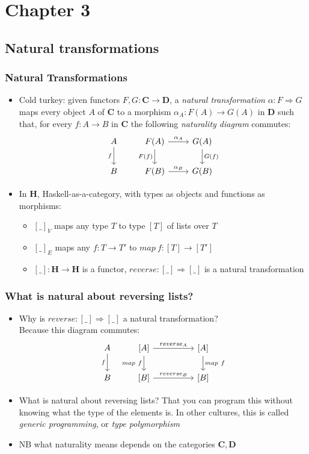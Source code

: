 \documentclass[handout]{beamer}
\title[INF223 presentations]{}
\newcommand{\To}{\Rightarrow}
\newcommand{\bfsf}[1]{{\boldsymbol{#1}}}
\newcommand{\CC}{\bfsf{C}}
\newcommand{\DD}{\bfsf{D}}
\newcommand{\HH}{\bfsf{H}}
\begin{document}
\section{Chapter 3}
\subsection{Natural transformations}
 
\frame
  {   
    \frametitle{Natural Transformations}\label{Ch3:NatTrans}

 \begin{itemize}[<+->]
\item Cold turkey: given functors $F,G: \CC\to\DD$, a \emph{natural transformation}
$\alpha: F\To G$ maps every object $A$ of $\CC$ to a morphism $\alpha_A : F(A)\to G(A)$
in $\DD$ such that, for every $f: A\to B$ in $\CC$ the following
\emph{naturality diagram} commutes:
\[
\begin{tikzcd}[ampersand replacement=\&]
A \arrow[swap]{d}{f} \& F(A)  \arrow[swap]{d}{F(f)}\arrow{r}{\alpha_A} \&\arrow{d}{G(f)} G(A)\\
B \& F(B)  \arrow{r}{\alpha_B} \& G(B)
\end{tikzcd}
\]
\item In $\HH$, Haskell-as-a-category, with types as objects and functions as morphisms:
   \begin{itemize}[<+->]
\item $[\_]_V$ maps any type $T$ to type $[T]$ of lists over $T$
\item $[\_]_E$ maps any $f: T\to T'$ to $map~f: [T] \to [T']$
\item $[\_]:\HH\to\HH$ is a functor, $reverse: [\_] \To [\_]$ is a natural transformation
   \end{itemize}
 \end{itemize}

 }

\frame
  {   
    \frametitle{What is natural about reversing lists?}\label{Ch3:reverse}

 \begin{itemize}[<+->]
\item Why is $reverse: [\_] \To [\_]$ a natural transformation?\\
Because this diagram commutes:
\[
\begin{tikzcd}[ampersand replacement=\&]
A \arrow[swap]{d}{f} \& {[A]}  \arrow[swap]{d}{map~f}\arrow{rr}{reverse_A} \&\& {[A]}\arrow{d}{map~f}\\
B \& {[B]}  \arrow{rr}{reverse_B}\& \& {[B]}
\end{tikzcd}
\]
\item What is natural about reversing lists?
That you can program this without knowing what the type of the elements is.
In other cultures, this is called \emph{generic programming},
or \emph{type polymorphism}
\item NB what naturality means depends on the categories $\CC,\DD$
 \end{itemize}

 }
\end{document}
